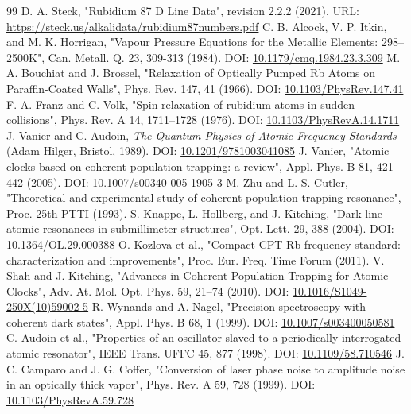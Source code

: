 \documentclass[11pt,a4paper]{article}
\begin{document}
\begin{thebibliography}{99}
 D. A. Steck, "Rubidium 87 D Line Data", revision 2.2.2 (2021). URL: \url{https://steck.us/alkalidata/rubidium87numbers.pdf}
 C. B. Alcock, V. P. Itkin, and M. K. Horrigan, "Vapour Pressure Equations for the Metallic Elements: 298--2500K", Can. Metall. Q. 23, 309-313 (1984). DOI: \href{https://doi.org/10.1179/cmq.1984.23.3.309}{10.1179/cmq.1984.23.3.309}
 M. A. Bouchiat and J. Brossel, "Relaxation of Optically Pumped Rb Atoms on Paraffin-Coated Walls", Phys. Rev. 147, 41 (1966). DOI: \href{https://doi.org/10.1103/PhysRev.147.41}{10.1103/PhysRev.147.41}
 F. A. Franz and C. Volk, "Spin-relaxation of rubidium atoms in sudden collisions", Phys. Rev. A 14, 1711--1728 (1976). DOI: \href{https://doi.org/10.1103/PhysRevA.14.1711}{10.1103/PhysRevA.14.1711}
 J. Vanier and C. Audoin, \textit{The Quantum Physics of Atomic Frequency Standards} (Adam Hilger, Bristol, 1989). DOI: \href{https://doi.org/10.1201/9781003041085}{10.1201/9781003041085}
 J. Vanier, "Atomic clocks based on coherent population trapping: a review", Appl. Phys. B 81, 421--442 (2005). DOI: \href{https://doi.org/10.1007/s00340-005-1905-3}{10.1007/s00340-005-1905-3}
 M. Zhu and L. S. Cutler, "Theoretical and experimental study of coherent population trapping resonance", Proc. 25th PTTI (1993).
 S. Knappe, L. Hollberg, and J. Kitching, "Dark-line atomic resonances in submillimeter structures", Opt. Lett. 29, 388 (2004). DOI: \href{https://doi.org/10.1364/OL.29.000388}{10.1364/OL.29.000388}
 O. Kozlova et al., "Compact CPT Rb frequency standard: characterization and improvements", Proc. Eur. Freq. Time Forum (2011).
 V. Shah and J. Kitching, "Advances in Coherent Population Trapping for Atomic Clocks", Adv. At. Mol. Opt. Phys. 59, 21--74 (2010). DOI: \href{https://doi.org/10.1016/S1049-250X(10)59002-5}{10.1016/S1049-250X(10)59002-5}
 R. Wynands and A. Nagel, "Precision spectroscopy with coherent dark states", Appl. Phys. B 68, 1 (1999). DOI: \href{https://doi.org/10.1007/s003400050581}{10.1007/s003400050581}
 C. Audoin et al., "Properties of an oscillator slaved to a periodically interrogated atomic resonator", IEEE Trans. UFFC 45, 877 (1998). DOI: \href{https://doi.org/10.1109/58.710546}{10.1109/58.710546}
 J. C. Camparo and J. G. Coffer, "Conversion of laser phase noise to amplitude noise in an optically thick vapor", Phys. Rev. A 59, 728 (1999). DOI: \href{https://doi.org/10.1103/PhysRevA.59.728}{10.1103/PhysRevA.59.728}

\end{thebibliography}
\end{document}
